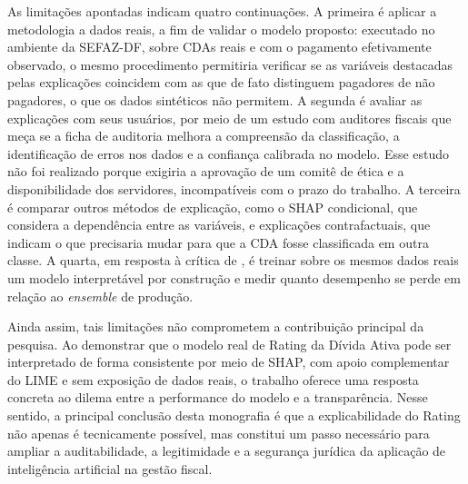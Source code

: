 As limitações apontadas indicam quatro continuações. A primeira é aplicar a metodologia a dados reais, a fim de validar o modelo proposto: executado no ambiente da SEFAZ-DF, sobre CDAs reais e com o pagamento efetivamente observado, o mesmo procedimento permitiria verificar se as variáveis destacadas pelas explicações coincidem com as que de fato distinguem pagadores de não pagadores, o que os dados sintéticos não permitem. A segunda é avaliar as explicações com seus usuários, por meio de um estudo com auditores fiscais que meça se a ficha de auditoria melhora a compreensão da classificação, a identificação de erros nos dados e a confiança calibrada no modelo. Esse estudo não foi realizado porque exigiria a aprovação de um comitê de ética e a disponibilidade dos servidores, incompatíveis com o prazo do trabalho. A terceira é comparar outros métodos de explicação, como o SHAP condicional, que considera a dependência entre as variáveis, e explicações contrafactuais, que indicam o que precisaria mudar para que a CDA fosse classificada em outra classe. A quarta, em resposta à crítica de , é treinar sobre os mesmos dados reais um modelo interpretável por construção e medir quanto desempenho se perde em relação ao \textit{ensemble} de produção.

Ainda assim, tais limitações não comprometem a contribuição principal da pesquisa. Ao demonstrar que o modelo real de Rating da Dívida Ativa pode ser interpretado de forma consistente por meio de SHAP, com apoio complementar do LIME e sem exposição de dados reais, o trabalho oferece uma resposta concreta ao dilema entre a performance do modelo e a transparência. Nesse sentido, a principal conclusão desta monografia é que a explicabilidade do Rating não apenas é tecnicamente possível, mas constitui um passo necessário para ampliar a auditabilidade, a legitimidade e a segurança jurídica da aplicação de inteligência artificial na gestão fiscal.
